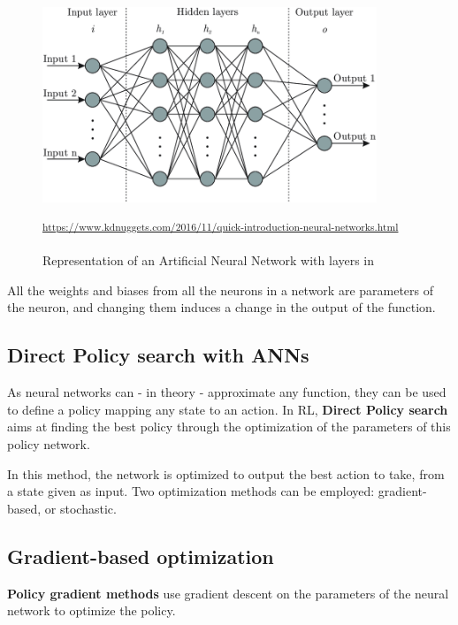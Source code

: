 \begin{figure}[H]
 \centering
 \captionsetup{justification=centering, margin=0.5cm}
 \includegraphics[width=10cm]{images/Artificial-neural-network-architecture-ANN-i-h-1-h-2-h-n-o.png}
 \caption{Representation of an Artificial Neural Network with layers in \cite{ann-graph}}
\small\textsuperscript{\url{https://www.kdnuggets.com/2016/11/quick-introduction-neural-networks.html}}
 \label{fig:ann}
\end{figure}

All the weights and biases from all the neurons in a network are parameters of the neuron, and changing them induces a change in the output of the function.  


\subsection{Direct Policy search with ANNs}

As neural networks \cite{perceptron} can - in theory - approximate any function, they can be used to define a policy mapping any state to an action. In RL, \textbf{Direct Policy search} aims at finding the best policy through the optimization of the parameters of this policy network.

In this method, the network is optimized to output the best action to take, from a state given as input. Two optimization methods can be employed: gradient-based, or stochastic.


\subsection{Gradient-based optimization}

\textbf{Policy gradient methods} use gradient descent \cite{sgd} on the parameters of the neural network to optimize the policy. 

